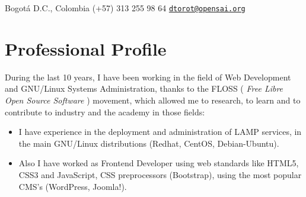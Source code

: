 \documentclass[overlapped,line,final]{res}
\begin{document}

\begin{resume}


	\begin{minipage}{0.5\linewidth}
    		Bogotá D.C., Colombia \newline
    		(+57) 313 255 98 64 \newline
		{\tt \href{mailto:dtorot@opensai.org}{dtorot@opensai.org}}
	\end{minipage}


\vspace{0.5cm}
\section{\sc Professional Profile}
\vspace{0.5cm}
During the last 10 years, I have been working in the field of Web Development and GNU/Linux Systems Administration, thanks to the FLOSS ( {\em Free Libre Open Source Software } ) movement, which allowed me to research, to learn and to contribute to industry and the academy in those fields:

\vspace{2mm}
\begin{itemize}
    \item I have experience in the deployment and administration of LAMP services, in the main GNU/Linux distributions (Redhat, CentOS, Debian-Ubuntu). 

    \item Also I have worked as Frontend Developer using web standards like HTML5, CSS3 and JavaScript, CSS preprocessors (Bootstrap), using the most popular CMS's (WordPress, Joomla!).


\end{itemize}
\end{resume}
\end{document}
